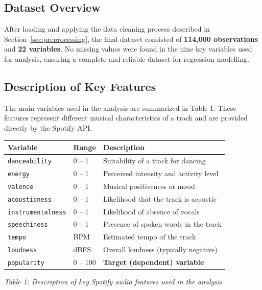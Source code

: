 \documentclass[12pt,a4paper]{article}
\begin{document}
\subsection{Dataset Overview}

After loading and applying the data cleaning process described in
Section~\ref{sec:preprocessing}, the final dataset consisted of
\textbf{114{,}000 observations} and \textbf{22 variables}. No missing
values were found in the nine key variables used for analysis, ensuring a
complete and reliable dataset for regression modelling.

\subsection{Description of Key Features}

The main variables used in the analysis are summarized in
Table 1. These features represent different musical
characteristics of a track and are provided directly by the Spotify API.

\begin{table}[ht]
\centering

\begin{tabular}{@{}lll@{}}
\toprule
\textbf{Variable}       & \textbf{Range} & \textbf{Description} \\
\midrule
\texttt{danceability}   & 0 -- 1 & Suitability of a track for dancing \\
\texttt{energy}         & 0 -- 1 & Perceived intensity and activity level \\
\texttt{valence}        & 0 -- 1 & Musical positiveness or mood \\
\texttt{acousticness}   & 0 -- 1 & Likelihood that the track is acoustic \\
\texttt{instrumentalness} & 0 -- 1 & Likelihood of absence of vocals \\
\texttt{speechiness}    & 0 -- 1 & Presence of spoken words in the track \\
\texttt{tempo}          & BPM    & Estimated tempo of the track \\
\texttt{loudness}       & dBFS   & Overall loudness (typically negative) \\
\midrule
\texttt{popularity}     & 0 -- 100 & \textbf{Target (dependent) variable} \\
\bottomrule
\end{tabular}

\vspace{0.3cm}

{\centering \textit{Table 1: Description of key Spotify audio features used in the analysis}\par}

\label{tab:features}

\end{table}
\end{document}
